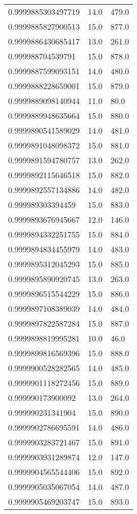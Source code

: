 \begin{center}
\begin{supertabular}[H]{p{0.30\textwidth}p{0.05\textwidth}p{0.05\textwidth}}
0.9999885303497719 & 14.0 & 479.0 \\ 
0.9999885827900513 & 15.0 & 877.0 \\ 
0.9999886430685417 & 13.0 & 261.0 \\ 
0.999988704539791 & 15.0 & 878.0 \\ 
0.9999887599093151 & 14.0 & 480.0 \\ 
0.9999888228659001 & 15.0 & 879.0 \\ 
0.9999889098140944 & 11.0 & 80.0 \\ 
0.9999889948635664 & 15.0 & 880.0 \\ 
0.9999890541589029 & 14.0 & 481.0 \\ 
0.9999891048098372 & 15.0 & 881.0 \\ 
0.9999891594780757 & 13.0 & 262.0 \\ 
0.9999892115646518 & 15.0 & 882.0 \\ 
0.9999892557134886 & 14.0 & 482.0 \\ 
0.999989303394459 & 15.0 & 883.0 \\ 
0.9999893676945667 & 12.0 & 146.0 \\ 
0.9999894332251755 & 15.0 & 884.0 \\ 
0.9999894834455979 & 14.0 & 483.0 \\ 
0.9999895312045293 & 15.0 & 885.0 \\ 
0.9999895890920745 & 13.0 & 263.0 \\ 
0.9999896515544229 & 15.0 & 886.0 \\ 
0.9999897108389039 & 14.0 & 484.0 \\ 
0.9999897822587284 & 15.0 & 887.0 \\ 
0.9999898819995281 & 10.0 & 46.0 \\ 
0.9999899816569396 & 15.0 & 888.0 \\ 
0.9999900528282565 & 14.0 & 485.0 \\ 
0.9999901118272456 & 15.0 & 889.0 \\ 
0.999990173900092 & 13.0 & 264.0 \\ 
0.999990231341904 & 15.0 & 890.0 \\ 
0.9999902786695591 & 14.0 & 486.0 \\ 
0.9999903283721467 & 15.0 & 891.0 \\ 
0.9999903931289874 & 12.0 & 147.0 \\ 
0.9999904565544406 & 15.0 & 892.0 \\ 
0.9999905035067054 & 14.0 & 487.0 \\ 
0.9999905469203747 & 15.0 & 893.0 \\ 

\end{supertabular}
\end{center}
